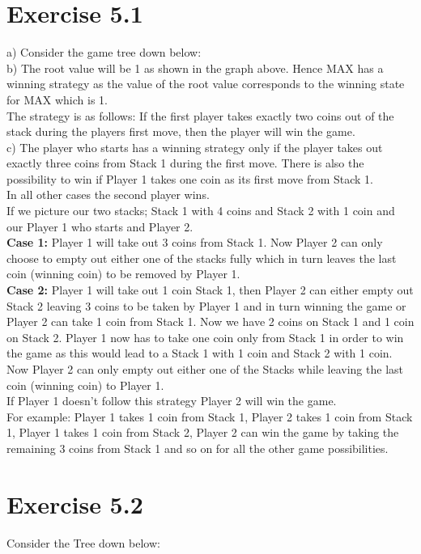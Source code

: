\documentclass[12pt]{article}
\begin{document}
\section*{Exercise 5.1}
a) Consider the game tree down below: \\
b) The root value will be 1 as shown in the graph above. Hence MAX has a winning strategy as the value of the root value corresponds to the winning state for MAX which is 1. \\
The strategy is as follows: If the first player takes exactly two coins out of the stack during the players first move, then the player will win the game.\\
c) The player who starts has a winning strategy only if the player takes out exactly three coins from Stack 1 during the first move. There is also the possibility to win if Player 1 takes one coin as its first move from Stack 1.\\ 
In all other cases the second player wins.\\
If we picture our two stacks; Stack 1 with 4 coins and Stack 2 with 1 coin and our Player 1 who starts and Player 2.\\
\textbf{Case 1:} Player 1 will take out 3 coins from Stack 1. Now Player 2 can only choose to empty out either one of the stacks fully which in turn leaves the last coin (winning coin) to be removed by Player 1.\\
\textbf{Case 2:} Player 1 will take out 1 coin Stack 1, then Player 2 can either empty out Stack 2 leaving 3 coins to be taken by Player 1 and in turn winning the game or Player 2 can take 1 coin from Stack 1. Now we have 2 coins on Stack 1 and 1 coin on Stack 2. Player 1 now has to take one coin only from Stack 1 in order to win the game as this would lead to a Stack 1 with 1 coin and Stack 2 with 1 coin. Now Player 2 can only empty out either one of the Stacks while leaving the last coin (winning coin) to Player 1.\\
If Player 1 doesn't follow this strategy Player 2 will win the game.\\
For example: Player 1 takes 1 coin from Stack 1, Player 2 takes 1 coin from Stack 1, Player 1 takes 1 coin from Stack 2, Player 2 can win the game by taking the remaining 3 coins from Stack 1 and so on for all the other game possibilities.\\


\section*{Exercise 5.2}
Consider the Tree down below: \\
\end{document}

